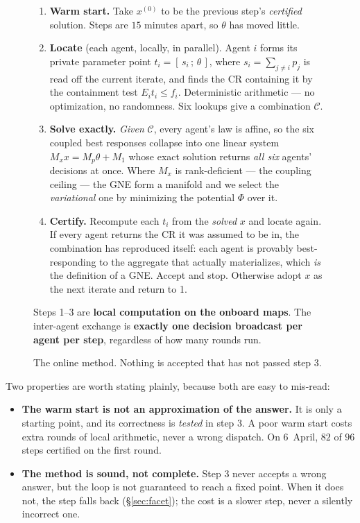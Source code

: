 \documentclass[11pt, letterpaper]{article}
\begin{document}
\begin{figure}[H]\centering
\begin{tcolorbox}[colback=blue!2!white,colframe=blue!50!black,width=0.94\textwidth,
                  title={\bfseries One 15-minute step: warm start $\to$ locate $\to$ solve $\to$ certify}]
\small
\begin{enumerate}[leftmargin=1.9em,nosep,itemsep=3pt]
\item[\textbf{0.}] \textbf{Warm start.} Take $x^{(0)}$ to be the previous step's \emph{certified}
solution. Steps are $15$ minutes apart, so $\theta$ has moved little.
\item[\textbf{1.}] \textbf{Locate} (each agent, locally, in parallel). Agent $i$ forms its private
parameter point $t_i=[\,s_i\,;\,\theta\,]$, where $s_i=\sum_{j\ne i}p_j$ is read off the current
iterate, and finds the CR containing it by the containment test $E_it_i\le f_i$. Deterministic
arithmetic --- no optimization, no randomness. Six lookups give a combination $\mathcal C$.
\item[\textbf{2.}] \textbf{Solve exactly.} \emph{Given} $\mathcal C$, every agent's law is affine, so
the six coupled best responses collapse into one linear system $M_xx=M_p\theta+M_1$ whose exact
solution returns \emph{all six} agents' decisions at once. Where $M_x$ is rank-deficient --- the
coupling ceiling --- the GNE form a manifold and we select the \emph{variational} one by minimizing
the potential $\Phi$ over it.
\item[\textbf{3.}] \textbf{Certify.} Recompute each $t_i$ from the \emph{solved} $x$ and locate again.
If every agent returns the CR it was assumed to be in, the combination has reproduced itself: each
agent is provably best-responding to the aggregate that actually materializes, which \emph{is} the
definition of a GNE. Accept and stop. Otherwise adopt $x$ as the next iterate and return to 1.
\end{enumerate}
\tcblower
\small Steps 1--3 are \textbf{local computation on the onboard maps}. The inter-agent exchange is
\textbf{exactly one decision broadcast per agent per step}, regardless of how many rounds run.
\end{tcolorbox}
\caption{The online method. Nothing is accepted that has not passed step 3.}
\label{fig:loop}
\end{figure}

Two properties are worth stating plainly, because both are easy to mis-read:
\begin{itemize}[leftmargin=1.4em,nosep]
\item \textbf{The warm start is not an approximation of the answer.} It is only a starting point, and
its correctness is \emph{tested} in step 3. A poor warm start costs extra rounds of local arithmetic,
never a wrong dispatch. On 6~April, $82$ of $96$ steps certified on the first round.
\item \textbf{The method is sound, not complete.} Step 3 never accepts a wrong answer, but the loop is
not guaranteed to reach a fixed point. When it does not, the step falls back (\S\ref{sec:facet}); the
cost is a slower step, never a silently incorrect one.
\end{itemize}
\end{document}
